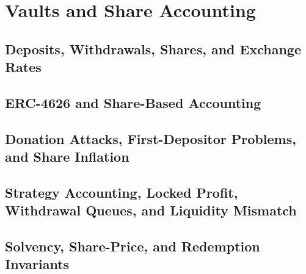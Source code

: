 \chapter{Vaults and Share Accounting}

\section{Deposits, Withdrawals, Shares, and Exchange Rates}

\section{ERC-4626 and Share-Based Accounting}

\section{Donation Attacks, First-Depositor Problems, and Share Inflation}

\section{Strategy Accounting, Locked Profit, Withdrawal Queues, and Liquidity Mismatch}

\section{Solvency, Share-Price, and Redemption Invariants}
